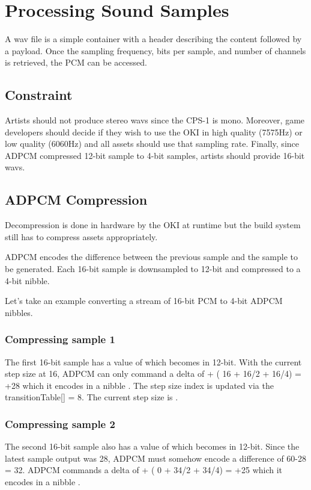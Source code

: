 \section{Processing Sound Samples}
A wav file is a simple container with a header describing the content followed by a payload. Once the sampling frequency, bits per sample, and number of channels is retrieved, the PCM can be accessed.

\subsection{Constraint}
Artists should not produce stereo wavs since the CPS-1 is mono. Moreover, game developers should decide if they wish to use the OKI in high quality (7575Hz) or low quality (6060Hz) and all assets should use that sampling rate. Finally, since ADPCM compressed 12-bit sample to 4-bit samples, artists should provide 16-bit wavs.

\subsection{ADPCM Compression}
Decompression is done in hardware by the OKI at runtime but the build system still has to compress assets appropriately. 

ADPCM encodes the difference between the previous sample and the sample to be generated. Each 16-bit sample is downsampled to 12-bit and compressed to a 4-bit nibble\cite{adpcm_specs}.





Let's take an example converting a stream of 16-bit PCM to 4-bit ADPCM nibbles.



\subsubsection{Compressing sample 1}
The first 16-bit sample has a value of  which becomes  in 12-bit. With the current step size at 16, ADPCM can only command a delta of + ( 16 + 16/2 + 16/4) = +28 which it encodes in a nibble . The step size index is updated via the transitionTable[] = 8. The current step size is . 

\subsubsection{Compressing sample 2}
The second 16-bit sample also has a value of  which becomes  in 12-bit. Since the latest sample output was 28, ADPCM must somehow encode a difference of 60-28 = 32. ADPCM commands a delta of + ( 0 + 34/2 + 34/4) = +25 which it encodes in a nibble . 

